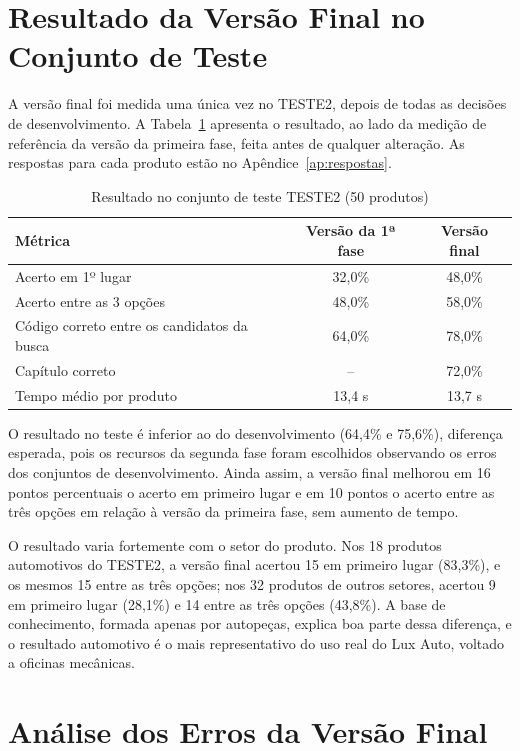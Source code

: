 \section{Resultado da Versão Final no Conjunto de Teste}

A versão final foi medida uma única vez no TESTE2, depois de todas as decisões de desenvolvimento. A Tabela~\ref{tab:teste2} apresenta o resultado, ao lado da medição de referência da versão da primeira fase, feita antes de qualquer alteração. As respostas para cada produto estão no Apêndice~\ref{ap:respostas}.

\begin{table}[H]
\centering
\caption{Resultado no conjunto de teste TESTE2 (50 produtos)}
\label{tab:teste2}
\begin{tabular}{p{6.4cm} c c}
\hline
\textbf{Métrica} & \textbf{Versão da 1ª fase} & \textbf{Versão final} \\
\hline
Acerto em 1º lugar & 32,0\% & 48,0\% \\
Acerto entre as 3 opções & 48,0\% & 58,0\% \\
Código correto entre os candidatos da busca & 64,0\% & 78,0\% \\
Capítulo correto & -- & 72,0\% \\
Tempo médio por produto & 13,4 s & 13,7 s \\
\hline
\end{tabular}
\end{table}

O resultado no teste é inferior ao do desenvolvimento (64,4\% e 75,6\%), diferença esperada, pois os recursos da segunda fase foram escolhidos observando os erros dos conjuntos de desenvolvimento. Ainda assim, a versão final melhorou em 16 pontos percentuais o acerto em primeiro lugar e em 10 pontos o acerto entre as três opções em relação à versão da primeira fase, sem aumento de tempo.

O resultado varia fortemente com o setor do produto. Nos 18 produtos automotivos do TESTE2, a versão final acertou 15 em primeiro lugar (83,3\%), e os mesmos 15 entre as três opções; nos 32 produtos de outros setores, acertou 9 em primeiro lugar (28,1\%) e 14 entre as três opções (43,8\%). A base de conhecimento, formada apenas por autopeças, explica boa parte dessa diferença, e o resultado automotivo é o mais representativo do uso real do Lux Auto, voltado a oficinas mecânicas.

\section{Análise dos Erros da Versão Final}


